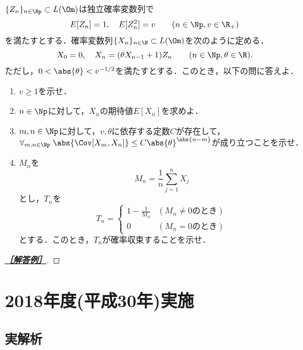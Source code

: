 \documentclass[uplatex,dvipdfmx]{jsarticle}
\begin{document}
\begin{tcolorbox}[colframe=ForestGreen, colback=ForestGreen!10!white,breakable,colbacktitle=ForestGreen!40!white,coltitle=black,fonttitle=\bfseries\sffamily,
title=B 第18問（確率論）]
    $\{Z_n\}_{n\in\Np}\subset L(\Om)$は独立確率変数列で
    \[E[Z_n]=1,\quad E[Z^2_n]=v\qquad(n\in\Np,v\in\R_+)\]
    を満たすとする．確率変数列$\{X_n\}_{n\in\N}\subset L(\Om)$を次のように定める．
    \[X_0=0,\quad X_n=(\theta X_{n-1}+1)Z_n\qquad(n\in\Np,\theta\in\R).\]
    ただし，$0<\abs{\theta}<v^{-1/2}$を満たすとする．このとき，以下の問に答えよ．
    \begin{enumerate}
        \item $v\ge1$を示せ．
        \item $n\in\Np$に対して，$X_n$の期待値$E[X_n]$を求めよ．
        \item $m,n\in\Np$に対して，$v,\theta$に依存する定数$C$が存在して，$\forall_{m,n\in\Np}\;\abs{\Cov[X_m,X_n]}\le C\abs{\theta}^{\abs{n-m}}$が成り立つことを示せ．
        \item $M_n$を
        \[M_n=\frac{1}{n}\sum^n_{j=1}X_j\]
        とし，$T_n$を
        \[T_n=\begin{cases}
            1-\frac{1}{M_n}&(M_n\ne0\text{のとき})\\
            0&(M_n=0\text{のとき})
        \end{cases}\]
        とする．このとき，$T_n$が確率収束することを示せ．
    \end{enumerate}
\end{tcolorbox}
\begin{proof}[\textbf{\underline{［解答例］}}]
    
\end{proof}

\section{2018年度(平成30年)実施}

\subsection{実解析}
\end{document}
